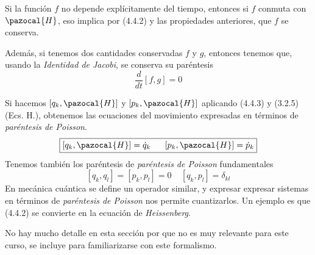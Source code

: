 Si la función $f$ no depende explícitamente del tiempo, entonces si $f$ conmuta con $\pazocal{H}$, eso implica por (4.4.2) y las propiedades anteriores, que $f$ se conserva.

Además, si tenemos dos cantidades conservadas $f$ y $g$, entonces tenemos que, usando la \textit{Identidad de Jacobi}, se conserva su paréntesis
\begin{equation} \label{4.4.5}
    \frac{d}{dt}[f,g]=0
\end{equation}

Si hacemos $[q_k,\pazocal{H}]$ y $[p_k,\pazocal{H}]$ aplicando (4.4.3) y (3.2.5) (Ecs. H.), obtenemos las ecuaciones del movimiento expresadas en términos de \textit{paréntesis de Poisson}.
\begin{equation} \label{4.4.6}
    \boxed{[q_k,\pazocal{H}] = \dot{q}_k \ \ \ \ \ [p_k,\pazocal{H}]=\dot{p}_k}
\end{equation}
Tenemos también los paréntesis de \textit{paréntesis de Poisson} fundamentales
\begin{equation} \label{4.4.7}
    [q_k,q_l]=[p_k,p_l]=0 \ \ \ \ \ [q_k,p_l]=\delta_{kl}
\end{equation}
En mecánica cuántica se define un operador similar, y expresar expresar sistemas en términos de \textit{paréntesis de Poisson} nos permite cuantizarlos. Un ejemplo es que (4.4.2) se convierte en la ecuación de \textit{Heissenberg}.

No hay mucho detalle en esta sección por que no es muy relevante para este curso, se incluye para familiarizarse con este formalismo.